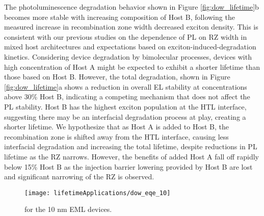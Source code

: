 \documentclass[../thesis.tex]{subfiles}
\begin{document}
The photoluminescence degradation behavior shown in Figure \ref{fig:dow_lifetime}b becomes more stable with increasing composition of Host B, following the measured increase in recombination zone width decreased exciton density. 
This is consistent with our previous studies on the dependence of PL on RZ width in mixed host architectures and expectations based on exciton-induced-degradation kinetics.\supercite{Bangsund2018,Giebink2008a} 
Considering device degradation by bimolecular processes, devices with high concentration of Host A might be expected to exhibit a shorter lifetime than those based on Host B. 
However, the total degradation, shown in Figure \ref{fig:dow_lifetime}a shows a reduction in overall EL stability at concentrations above 30\% Host B, indicating a competing mechanism that does not affect the PL stability.  
Host B has the highest exciton population at the HTL interface, suggesting there may be an interfacial degradation process at play, creating a shorter lifetime.\supercite{Hershey2017,Wang2013} 
We hypothesize that as Host A is added to Host B, the recombination zone is shifted away from the HTL interface, causing less interfacial degradation and increasing the total lifetime, despite reductions in PL lifetime as the RZ narrows. 
However, the benefits of added Host A fall off rapidly below 15\% Host B as the injection barrier lowering provided by Host B are lost and significant narrowing of the RZ is observed.

\begin{wrapfigure}{r}{.5\textwidth}
\centering
\texttt{[image: lifetimeApplications/dow\_eqe\_10]}
\caption{\eqe for the 10 nm EML devices.}
\label{fig:dow_eqe_10}
\end{wrapfigure}
\end{document}
